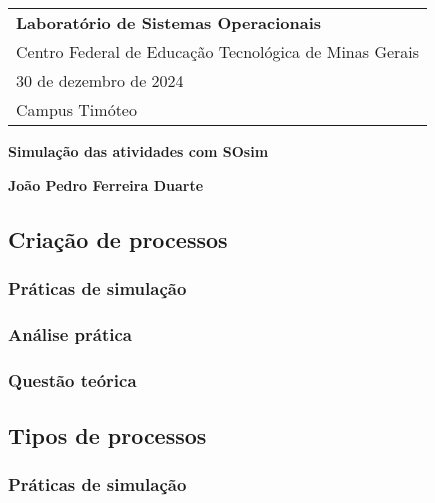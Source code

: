 \documentclass[a4paper,12pt]{article} %
\begin{document}

\thispagestyle{empty} %

\begin{tabular}{p{\textwidth}}
{\large \textbf{Laboratório de Sistemas Operacionais}} \\
Centro Federal de Educação Tecnológica de Minas Gerais \\
30 de dezembro de 2024 \\ Campus Timóteo \\
\hline
\end{tabular}

\vspace*{0.3cm}

\begin{center}
    {\Large \textbf{Simulação das atividades com SOsim}}
    \vspace{2mm}
    
    {\textbf{João Pedro Ferreira Duarte}}
\end{center}
\vspace{0.4cm}

\subsection[]{Criação de processos}
\subsubsection[]{Práticas de simulação}
\subsubsection[]{Análise prática}
\subsubsection[]{Questão teórica}

\subsection[]{Tipos de processos}
\subsubsection[]{Práticas de simulação}
\end{document}
